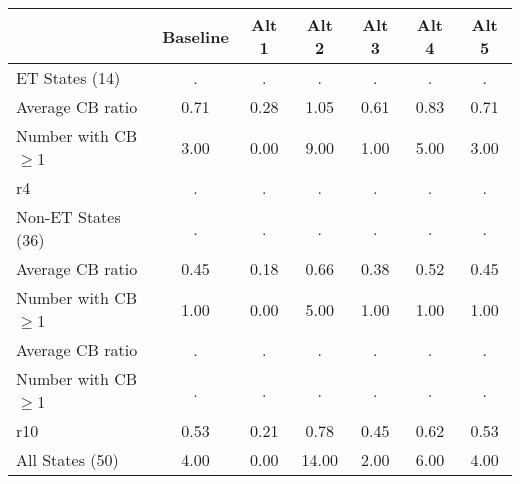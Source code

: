 \begin{table}[htbp]
\begin{tabular}{|l|c|c|c|c|c|c|}\hline  
 & Baseline  & Alt 1  & Alt 2  & Alt 3  & Alt 4  & Alt 5  \\ \hline  
ET States (14) &   . &   . &   . &   . &   . &   . \\ \hline 
Average CB ratio & 0.71 & 0.28 & 1.05 & 0.61 & 0.83 & 0.71 \\ \hline 
Number with CB$\geq$1 & 3.00 & 0.00 & 9.00 & 1.00 & 5.00 & 3.00 \\ \hline 
r4 &   . &   . &   . &   . &   . &   . \\ \hline 
Non-ET States (36) &   . &   . &   . &   . &   . &   . \\ \hline 
Average CB ratio & 0.45 & 0.18 & 0.66 & 0.38 & 0.52 & 0.45 \\ \hline 
Number with CB$\geq$1 & 1.00 & 0.00 & 5.00 & 1.00 & 1.00 & 1.00 \\ \hline 
Average CB ratio &   . &   . &   . &   . &   . &   . \\ \hline 
Number with CB$\geq$1 &   . &   . &   . &   . &   . &   . \\ \hline 
r10 & 0.53 & 0.21 & 0.78 & 0.45 & 0.62 & 0.53 \\ \hline 
All States (50) & 4.00 & 0.00 & 14.00 & 2.00 & 6.00 & 4.00 \\ \hline 
  \end{tabular}
\end{table}
